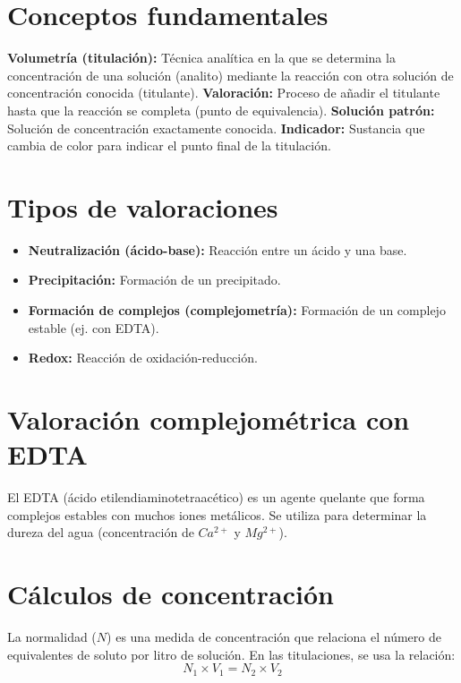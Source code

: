 \section{Conceptos fundamentales}

\textbf{Volumetría (titulación):} Técnica analítica en la que se determina la concentración de una solución (analito) mediante la reacción con otra solución de concentración conocida (titulante).
\textbf{Valoración:} Proceso de añadir el titulante hasta que la reacción se completa (punto de equivalencia).
\textbf{Solución patrón:} Solución de concentración exactamente conocida.
\textbf{Indicador:} Sustancia que cambia de color para indicar el punto final de la titulación.


\section{Tipos de valoraciones}
\begin{itemize}
    \item \textbf{Neutralización (ácido-base):} Reacción entre un ácido y una base.
    \item \textbf{Precipitación:} Formación de un precipitado.
    \item \textbf{Formación de complejos (complejometría):} Formación de un complejo estable (ej. con EDTA).
    \item \textbf{Redox:} Reacción de oxidación-reducción.
\end{itemize}

\section{Valoración complejométrica con EDTA}
El EDTA (ácido etilendiaminotetraacético) es un agente quelante que forma complejos estables con muchos iones metálicos. Se utiliza para determinar la dureza del agua (concentración de $Ca^{2+}$ y $Mg^{2+}$).

\section{Cálculos de concentración}
La normalidad ($N$) es una medida de concentración que relaciona el número de equivalentes de soluto por litro de solución. En las titulaciones, se usa la relación:
\[
N_{1} \times V_{1} = N_{2} \times V_{2}
\]


